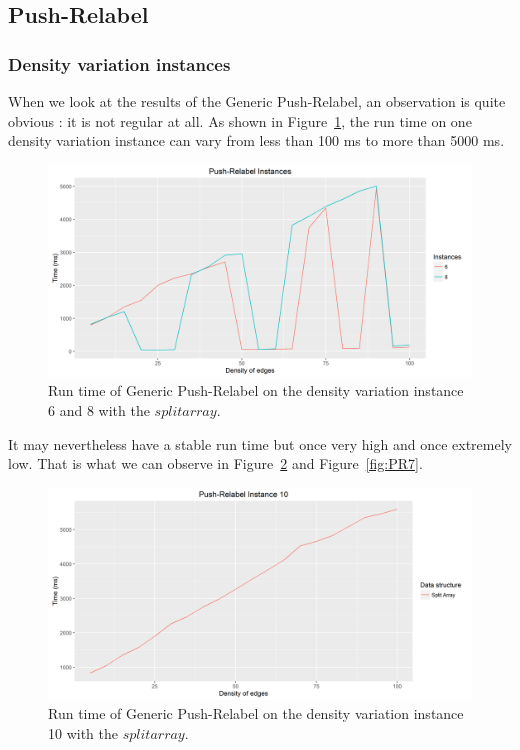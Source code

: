 \subsection{Push-Relabel}
\subsubsection{Density variation instances}
When we look at the results of the Generic Push-Relabel, an observation is quite obvious : it is not regular at all. As shown in Figure~\ref{fig:PR6}, the run time on one density variation instance can vary from less than 100 ms to more than 5000 ms.
\begin{figure}[H]
\begin{center}
\includegraphics[scale=0.5]{images/pri68.png}
\caption{Run time of Generic Push-Relabel on the density variation instance 6 and 8 with the $split array$.}
\label{fig:PR6}
\end{center}
\end{figure}
It may nevertheless have a stable run time but once very high and once extremely low. That is what we can observe in Figure~\ref{fig:PR10} and Figure~\ref{fig:PR7}.
\begin{figure}[H]
\begin{center}
\includegraphics[scale=0.5]{images/pri10.png}
\caption{Run time of Generic Push-Relabel on the density variation instance 10 with the $split array$.}
\label{fig:PR10}
\end{center}
\end{figure}
